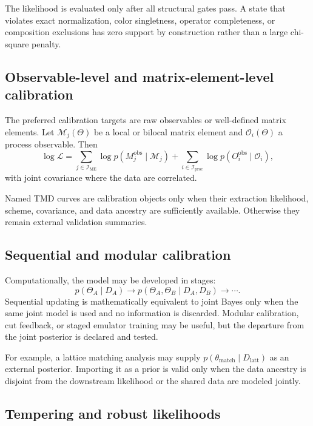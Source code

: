 \documentclass[11pt]{article}
\newcommand{\cO}{\mathcal O}
\newcommand{\cM}{\mathcal M}
\newcommand{\cL}{\mathcal L}
\newcommand{\cI}{\mathcal I}
\newcommand{\latt}{\mathrm{latt}}
\newcommand{\obs}{\mathrm{obs}}
\newcommand{\matchp}{\mathrm{match}}
\newcommand{\proc}{\mathrm{proc}}
\begin{document}
The likelihood is evaluated only after all structural gates pass.  A state
that violates exact normalization, color singletness, operator completeness,
or composition exclusions has zero support by construction rather than a
large chi-square penalty.

\subsection{Observable-level and matrix-element-level calibration}

The preferred calibration targets are raw observables or well-defined matrix
elements.  Let \(\cM_j(\Theta)\) be a local or bilocal matrix element and
\(\cO_i(\Theta)\) a process observable.  Then
\begin{equation}
 \log\cL
 =
 \sum_{j\in\cI_{\mathrm{ME}}}
 \log p(M_j^{\obs}\mid\cM_j)
 +
 \sum_{i\in\cI_{\proc}}
 \log p(O_i^{\obs}\mid\cO_i),
 \label{eq:matrix-and-process-likelihood}
\end{equation}
with joint covariance where the data are correlated.

Named TMD curves are calibration objects only when their extraction
likelihood, scheme, covariance, and data ancestry are sufficiently available.
Otherwise they remain external validation summaries.

\subsection{Sequential and modular calibration}

Computationally, the model may be developed in stages:
\begin{equation}
 p(\Theta_A\mid D_A)
 \longrightarrow
 p(\Theta_A,\Theta_B\mid D_A,D_B)
 \longrightarrow\cdots .
 \label{eq:sequential-calibration}
\end{equation}
Sequential updating is mathematically equivalent to joint Bayes only when the
same joint model is used and no information is discarded.  Modular
calibration, cut feedback, or staged emulator training may be useful, but the
departure from the joint posterior is declared and tested.

For example, a lattice matching analysis may supply
\(p(\theta_{\matchp}\mid D_{\latt})\) as an external posterior.  Importing it as
a prior is valid only when the data ancestry is disjoint from the downstream
likelihood or the shared data are modeled jointly.

\subsection{Tempering and robust likelihoods}
\end{document}
